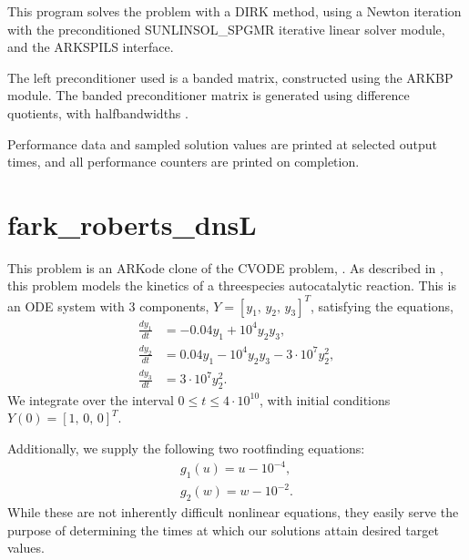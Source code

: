 \documentclass[letterpaper,10pt,english]{sphinxmanual}
\begin{document}
\sphinxAtStartPar
This program solves the problem with a DIRK method, using a Newton
iteration with the preconditioned SUNLINSOL\_SPGMR iterative linear
solver module, and the ARKSPILS interface.

\sphinxAtStartPar
The left preconditioner used is a banded matrix, constructed using
the ARKBP module.  The banded preconditioner matrix is generated using
difference quotients, with half\sphinxhyphen{}bandwidths .

\sphinxAtStartPar
Performance data and sampled solution values are printed at
selected output times, and all performance counters are printed
on completion.


\section{fark\_roberts\_dnsL}
\label{\detokenize{f2003_serial:fark-roberts-dnsl}}\label{\detokenize{f2003_serial:id3}}
\sphinxAtStartPar
This problem is an ARKode clone of the CVODE problem,
.  As described in , this problem models
the kinetics of a three\sphinxhyphen{}species autocatalytic reaction.  This is an
ODE system with 3 components, \(Y = [y_1,\, y_2,\, y_3]^T\),
satisfying the equations,
\begin{equation*}
\begin{split}\frac{d y_1}{dt} &= -0.04 y_1 + 10^4 y_2 y_3, \\
\frac{d y_2}{dt} &= 0.04 y_1 - 10^4 y_2 y_3 - 3\cdot10^7 y_2^2, \\
\frac{d y_3}{dt} &= 3\cdot10^7 y_2^2.\end{split}
\end{equation*}
\sphinxAtStartPar
We integrate over the interval \(0\le t\le 4\cdot10^{10}\), with initial
conditions  \(Y(0) = [1,\, 0,\, 0]^T\).

\sphinxAtStartPar
Additionally, we supply the following two root\sphinxhyphen{}finding equations:
\begin{equation*}
\begin{split}g_1(u) = u - 10^{-4}, \\
g_2(w) = w - 10^{-2}.\end{split}
\end{equation*}
\sphinxAtStartPar
While these are not inherently difficult nonlinear equations, they
easily serve the purpose of determining the times at which our
solutions attain desired target values.
\end{document}
